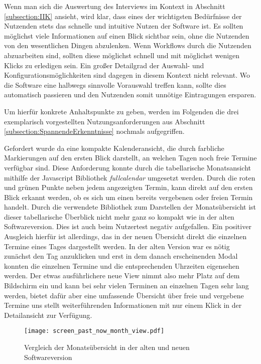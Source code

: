 Wenn man sich die Auswertung des Interviews im Kontext in Abschnitt
\ref{subsection:IIK} ansieht, wird klar, dass eines der wichtigsten Bedürfnisse
der Nutzenden stets das schnelle und intuitive Nutzen der Software ist. Es
sollten möglichst viele Informationen auf einen Blick sichtbar sein, ohne die
Nutzenden von den wesentlichen Dingen abzulenken. Wenn Workflows durch die
Nutzenden abzuarbeiten sind, sollten diese möglichst schnell und mit möglichst
wenigen Klicks zu erledigen sein. Ein großer Detailgrad der Auswahl- und
Konfigurationsmöglichkeiten sind dagegen in diesem Kontext nicht relevant. Wo
die Software eine halbwegs sinnvolle Vorauswahl treffen kann, sollte dies
automatisch passieren und den Nutzenden somit unnötige Eintragungen ersparen.

Um hierfür konkrete Anhaltspunkte zu geben, werden im Folgenden die drei
exemplarisch vorgestellten Nutzungsanforderungen aus Abschnitt
\ref{subsection:SpannendeErkenntnisse} nochmals aufgegriffen.

Gefordert wurde da eine kompakte Kalenderansicht, die durch farbliche
Markierungen auf den ersten Blick darstellt, an welchen Tagen noch freie
Termine verfügbar sind. Diese Anforderung konnte durch die tabellarische
Monatsansicht mithilfe der Javascript Bibliothek \textit{fullcalendar}
umgesetzt werden. Durch die roten und grünen Punkte neben jedem angezeigten
Termin, kann direkt auf den ersten Blick erkannt werden, ob es sich um einen
bereits vergebenen oder freien Termin handelt. Durch die verwendete Bibliothek
zum Darstellen der Monatsübersicht ist dieser tabellarische Überblick nicht
mehr ganz so kompakt wie in der alten Softwareversion. Dies ist auch \ipName
beim Nutzertest negativ aufgefallen. Ein positiver Ausgleich hierfür ist
allerdings, das in der neuen Übersicht direkt die einzelnen Termine eines Tages
dargestellt werden. In der alten Version war es nötig zunächst den Tag
anzuklicken und erst in dem danach erscheinenden Modal konnten die einzelnen
Termine und die entsprechenden Uhrzeiten eigensehen werden. Der etwas
ausführlichere neue View nimmt also mehr Platz auf dem Bildschirm ein und kann
bei sehr vielen Terminen an einzelnen Tagen sehr lang werden, bietet dafür aber
eine umfassende Übersicht über freie und vergebene Termine uns stellt
weiterführenden Informationen mit nur einem Klick in der Detailansicht zur
Verfügung.

\begin{figure}[H]
    \caption{Vergleich der Monatsübersicht in der alten und neuen Softwareversion}
    \centering
    \texttt{[image: screen\_past\_now\_month\_view.pdf]}
\end{figure}

